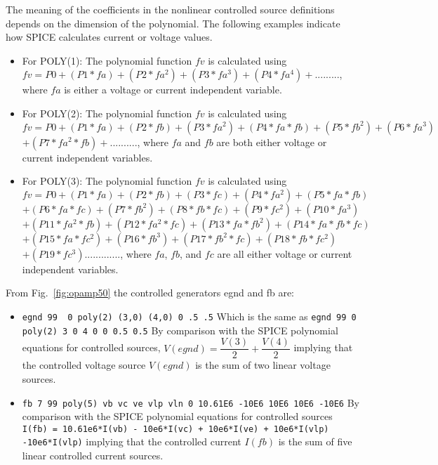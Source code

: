 The meaning of the coefficients in the nonlinear controlled source definitions depends on the dimension of the polynomial. The following examples indicate how SPICE calculates current or voltage values.
\begin{itemize}
 \item For POLY(1): The polynomial function $fv$ is calculated using\linebreak 
$fv=P0+(P1*fa)+(P2*fa^{2})+(P3*fa^{3})+(P4*fa^{4})+.........$, \linebreak where $fa$ is either a voltage or current independent variable.
 \item For POLY(2): The polynomial function $fv$ is calculated using\linebreak 
$fv=P0+(P1*fa)+(P2*fb)+(P3*fa^{2})+(P4*fa*fb)+(P5*fb^{2})+(P6*fa^{3})$ 
$+(P7*fa^{2}*fb)+..........$, where $fa$ and $fb$ are both either voltage or current independent variables.
\item For POLY(3): The polynomial function $fv$ is calculated using\linebreak 
$fv=P0+(P1*fa)+(P2*fb)+(P3*fc)+(P4*fa^{2})+(P5*fa*fb)$
$+(P6*fa*fc)+(P7*fb^{2})+(P8*fb*fc)+(P9*fc^{2})+(P10*fa^{3})$
$+(P11*fa^{2}*fb)+(P12*fa^{2}*fc)+(P13*fa*fb^{2})+(P14*fa*fb*fc)$
$+(P15*fa*fc^{2})+(P16*fb^{3})+(P17*fb^{2}*fc)+(P18*fb*fc^{2})$
$+(P19*fc^{3}).............$, where $fa$, $fb$, and $fc$ are all either voltage or current independent variables.
\end{itemize}

From Fig.~\ref{fig:opamp50} the controlled generators egnd and fb are:
 
\begin{itemize}
 \item \verb|egnd 99  0 poly(2) (3,0) (4,0) 0 .5 .5| \linebreak Which is the same as \verb|egnd 99 0 poly(2) 3 0 4 0 0 0.5 0.5| \linebreak By comparison with the SPICE polynomial equations for controlled sources, \linebreak $V(egnd) = \dfrac{V(3)}{2}+\dfrac{V(4)}{2}$  implying that the controlled voltage source $V(egnd)$ is the sum of two linear voltage sources. 

 \item \verb|fb 7 99 poly(5) vb vc ve vlp vln 0 10.61E6 -10E6 10E6 10E6 -10E6| \linebreak  By comparison with the SPICE polynomial equations for controlled sources \linebreak \verb|I(fb) = 10.61e6*I(vb) - 10e6*I(vc) + 10e6*I(ve) + 10e6*I(vlp) -10e6*I(vlp)| implying that the controlled current $I(fb)$ is the sum of five linear controlled current sources.
\end{itemize}

